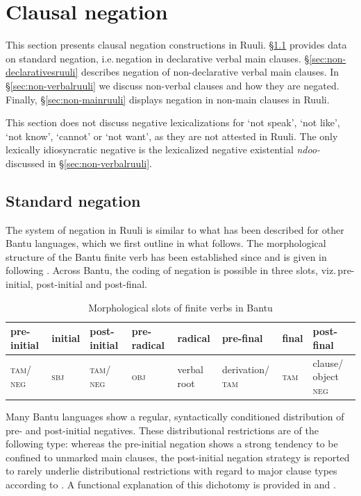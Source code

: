 \documentclass[output=paper,colorlinks,citecolor=brown,draftmode]{langscibook}
\begin{document}
\section{Clausal negation}\label{sec:clausalruuli}

This section presents clausal negation constructions in Ruuli. 
§\ref{sec:standardruuli} provides data on standard negation, i.e.\,negation in declarative verbal main clauses. §\ref{sec:non-declarativesruuli} describes negation of non-declarative verbal main clauses. 
In §\ref{sec:non-verbalruuli} we discuss non-verbal clauses and how they are negated. 
Finally, §\ref{sec:non-mainruuli} displays negation in non-main clauses in Ruuli.

This section does not discuss negative lexicalizations for `not speak', `not like', `not know', `cannot' or `not want', as they are not attested in Ruuli.    
The only lexically idiosyncratic negative is the lexicalized negative existential \textit{ndoo-} discussed in §\ref{sec:non-verbalruuli}. 

\subsection{Standard negation}
\label{sec:standardruuli}\label{sec:ruulietal:2.1}
The system of negation in Ruuli is similar to what has been described for other Bantu languages, which we first outline in what follows. 
The morphological structure of the Bantu finite verb has been established since \citet[108–111]{Meeussen1967} and is given in  following \citet[546]{Güldemann1999}. 
Across Bantu, the coding of negation is possible in three slots, viz.\,pre-initial, post-initial and post-final.

\begin{table}
\small
    \begin{tabularx}{\textwidth}{Q|l|Q|Q|Q|p{16mm}|l|Q}
         pre-initial & initial & post-initial & pre-radical  & radical & pre-final & final & post-final\\
         \midrule
         \scshape tam/ neg & \scshape sbj & \scshape tam/ neg & \scshape obj & verbal root & derivation/ \textsc{tam}& \textsc{tam} & clause/ object \textsc{neg}\\
    \end{tabularx}
    \caption{Morphological slots of finite verbs in Bantu}
    \label{tab:Bantuslots}
\end{table}


Many Bantu languages show a regular, syntactically conditioned distribution of pre- and post-initial negatives. 
These distributional restrictions are of the following type: whereas the pre-initial negation shows a strong tendency to be confined to unmarked main clauses, the post-initial negation strategy is reported to rarely underlie distributional restrictions with regard to major clause types according to \citet[551]{Güldemann1999}. 
A functional explanation of this dichotomy is provided in \citet[305–308]{Güldemann1996} and \citet[570--576]{Güldemann1999}.
\end{document}
